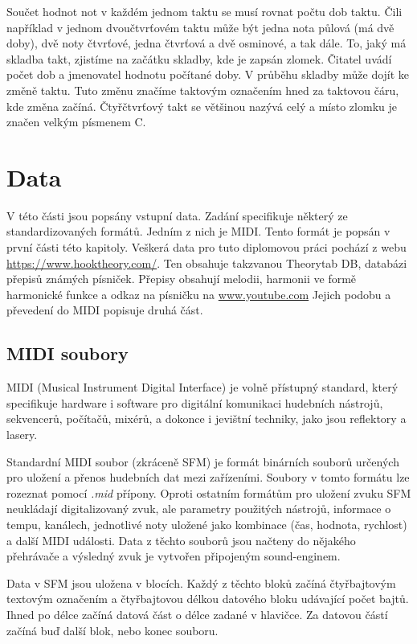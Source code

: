 Součet hodnot not v každém jednom taktu se musí rovnat počtu dob taktu.
Čili například v jednom  dvoučtvrťovém taktu 
může být jedna nota půlová (má dvě doby), 
dvě noty čtvrťové, jedna čtvrťová a dvě osminové, a tak dále.
To, jaký má skladba takt, zjistíme na začátku skladby, kde je zapsán zlomek.
Čitatel uvádí počet dob a jmenovatel hodnotu počítané doby.
V průběhu skladby může dojít ke změně taktu.
Tuto změnu značíme taktovým označením hned za taktovou čáru, 
kde změna začíná.
Čtyřčtvrťový takt se většinou nazývá celý 
a místo zlomku je značen velkým písmenem C.
\cite{cmiral,zenkl}

\chapter{Data}
V této části jsou popsány vstupní data.
Zadání specifikuje některý ze standardizovaných formátů.
Jedním z nich je MIDI.
Tento formát je popsán v první části této kapitoly.
Veškerá data pro tuto diplomovou práci pochází z webu \url{https://www.hooktheory.com/}.
Ten obsahuje takzvanou Theorytab DB, databázi přepisů známých písniček.
Přepisy obsahují melodii, harmonii ve formě harmonické funkce a odkaz na písničku na \url{www.youtube.com}
Jejich podobu a převedení do MIDI popisuje druhá část.

\section{MIDI soubory}
MIDI (Musical Instrument Digital Interface) je volně přístupný standard,
který specifikuje hardware i software 
pro digitální komunikaci hudebních nástrojů,
sekvencerů, počítačů, mixérů, 
a dokonce i jevištní techniky, jako jsou reflektory a lasery.
\cite{MIDI_tutorials}
\par

Standardní MIDI soubor (zkráceně SFM) je formát binárních souborů 
určených pro uložení a přenos hudebních dat mezi zařízeními.
Soubory v tomto formátu lze rozeznat pomocí \emph{.mid} přípony.
Oproti ostatním formátům pro uložení zvuku 
SFM neukládají digitalizovaný zvuk,
ale parametry použitých nástrojů, informace o tempu, kanálech, 
jednotlivé noty uložené jako kombinace (čas, hodnota, rychlost) 
a další MIDI události.
Data z těchto souborů jsou načteny do nějakého přehrávače 
a výsledný zvuk je vytvořen připojeným sound-enginem.
\cite{MIDI_tutorials,Neznamy_aboutMIDIFiles}
\par

Data v SFM jsou uložena v blocích.
Každý z těchto bloků začíná čtyřbajtovým textovým označením 
a čtyřbajtovou délkou datového bloku udávající počet bajtů.
Ihned po délce začíná datová část o délce zadané v hlavičce.
Za datovou částí začíná buď další blok, nebo konec souboru.
\cite{MIDI_tutorials,Back_SMF_Specif}
\par

